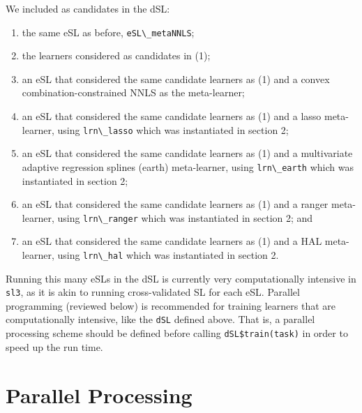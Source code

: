 \documentclass[
  12pt, krantz2,
]{krantz}
\newcommand{\passthrough}[1]{#1}
\providecommand{\tightlist}{%
  \setlength{\itemsep}{0pt}\setlength{\parskip}{0pt}}
\newcommand{\1}{\mathbbm{1}}
\theoremstyle{definition}
\theoremstyle{definition}
\theoremstyle{definition}
\theoremstyle{definition}
\theoremstyle{remark}
\begin{document}
We included as candidates in the dSL:

\begin{enumerate}
\def\labelenumi{\arabic{enumi}.}
\tightlist
\item
  the same eSL as before, \passthrough{\lstinline!eSL\_metaNNLS!};
\item
  the learners considered as candidates in (1);
\item
  an eSL that considered the same candidate learners as (1) and a convex
  combination-constrained NNLS as the meta-learner;
\item
  an eSL that considered the same candidate learners as (1) and a lasso
  meta-learner, using \passthrough{\lstinline!lrn\_lasso!} which was instantiated in section 2;
\item
  an eSL that considered the same candidate learners as (1) and a
  multivariate adaptive regression splines (earth) meta-learner, using
  \passthrough{\lstinline!lrn\_earth!} which was instantiated in section 2;
\item
  an eSL that considered the same candidate learners as (1) and a
  ranger meta-learner, using \passthrough{\lstinline!lrn\_ranger!} which was instantiated in section 2; and
\item
  an eSL that considered the same candidate learners as (1) and a
  HAL meta-learner, using \passthrough{\lstinline!lrn\_hal!} which was instantiated in section 2.
\end{enumerate}

Running this many eSLs in the dSL is currently very computationally intensive
in \passthrough{\lstinline!sl3!}, as it is akin to running cross-validated SL for each eSL. Parallel
programming (reviewed below) is recommended for training learners that are
computationally intensive, like the \passthrough{\lstinline!dSL!} defined above. That is, a parallel
processing scheme should be defined before calling \passthrough{\lstinline!dSL$train(task)!} in order
to speed up the run time.

\hypertarget{parallel-processing}{%
\section{Parallel Processing}\label{parallel-processing}}
\end{document}
